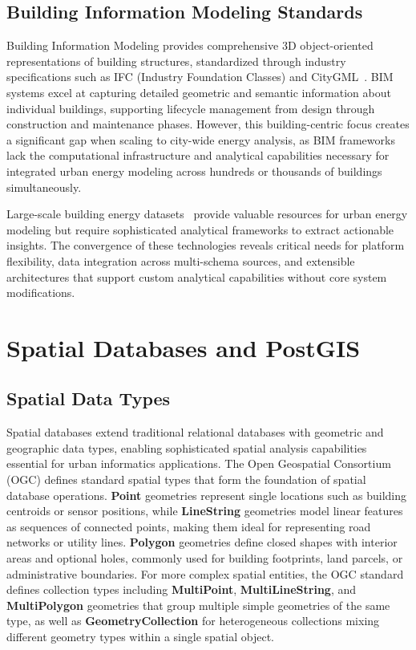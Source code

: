 \subsection{Building Information Modeling Standards}

Building Information Modeling provides comprehensive 3D object-oriented representations of building structures, standardized through industry specifications such as IFC (Industry Foundation Classes) and CityGML~\cite{dong2013citygml,smartcities_bim2023}. BIM systems excel at capturing detailed geometric and semantic information about individual buildings, supporting lifecycle management from design through construction and maintenance phases. However, this building-centric focus creates a significant gap when scaling to city-wide energy analysis, as BIM frameworks lack the computational infrastructure and analytical capabilities necessary for integrated urban energy modeling across hundreds or thousands of buildings simultaneously.

Large-scale building energy datasets~\cite{miller2020buildingdata} provide valuable resources for urban energy modeling but require sophisticated analytical frameworks to extract actionable insights. The convergence of these technologies reveals critical needs for platform flexibility, data integration across multi-schema sources, and extensible architectures that support custom analytical capabilities without core system modifications.



\section{Spatial Databases and PostGIS}

\subsection{Spatial Data Types}

Spatial databases extend traditional relational databases with geometric and geographic data types, enabling sophisticated spatial analysis capabilities essential for urban informatics applications. The Open Geospatial Consortium (OGC) defines standard spatial types that form the foundation of spatial database operations. \textbf{Point} geometries represent single locations such as building centroids or sensor positions, while \textbf{LineString} geometries model linear features as sequences of connected points, making them ideal for representing road networks or utility lines. \textbf{Polygon} geometries define closed shapes with interior areas and optional holes, commonly used for building footprints, land parcels, or administrative boundaries. For more complex spatial entities, the OGC standard defines collection types including \textbf{MultiPoint}, \textbf{MultiLineString}, and \textbf{MultiPolygon} geometries that group multiple simple geometries of the same type, as well as \textbf{GeometryCollection} for heterogeneous collections mixing different geometry types within a single spatial object.

